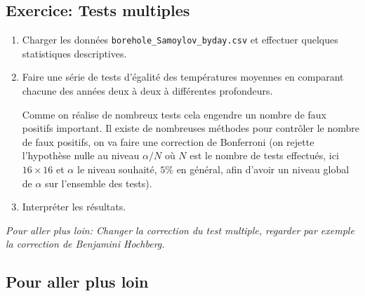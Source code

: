 \documentclass[a4paper,12pt]{article}
\theoremstyle{exercice}
\begin{document}
	
	
	
	
 
 \subsection*{Exercice: Tests multiples}


\begin{enumerate}
\item
Charger les données \texttt{borehole\_Samoylov\_byday.csv} et effectuer quelques statistiques descriptives.
\item Faire une série de  tests d'égalité des températures moyennes en comparant chacune des années deux à deux à différentes profondeurs. 

Comme on réalise de nombreux tests cela engendre un nombre de faux positifs important. 
Il existe de nombreuses méthodes pour contrôler le nombre de faux positifs,
 on va faire une correction de Bonferroni (on rejette l'hypothèse nulle au niveau $\alpha/N$ où $N$ est le nombre de tests effectués, ici $16\times16$ et $\alpha$ le niveau souhaité, $5\%$ en général, afin d'avoir un niveau global de $\alpha$ sur l'ensemble des tests). 
 
\item
Interpréter les résultats.
 


\end{enumerate}

\textit{Pour aller plus loin: Changer la correction du test multiple, regarder par exemple la correction de Benjamini Hochberg.}

	
	


	\subsection*{Pour aller plus loin}
	
\end{document}
